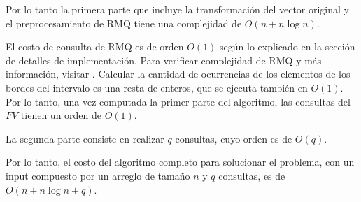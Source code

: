 Por lo tanto la primera parte que incluye la transformación del vector
original y el preprocesamiento de RMQ tiene una complejidad de $O(n + n\log n)$.

El costo de consulta de RMQ es de orden $O(1)$ según lo explicado en la
sección de detalles de implementación. Para verificar complejidad de RMQ y
más información, visitar \cite{topcoder}. Calcular la cantidad de ocurrencias
de los elementos de los bordes del intervalo es una resta de enteros, que se
ejecuta también en $O(1)$. Por lo tanto, una vez computada la primer parte del
algoritmo, las consultas del $FV$ tienen un orden de $O(1)$.

La segunda parte consiste en realizar $q$ consultas, cuyo orden es de $O(q)$.

Por lo tanto, el costo del algoritmo completo para solucionar el problema, con un
input compuesto por un arreglo de tamaño $n$ y $q$ consultas, es de
$O(n + n\log n + q)$.
